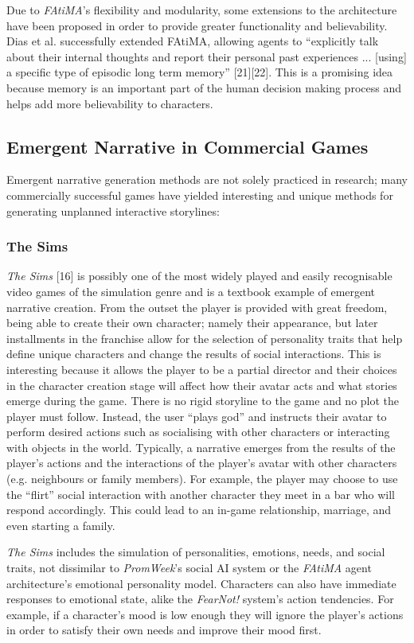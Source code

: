 \documentclass{sig-alternate-05-2015}
\begin{document}
Due to \textit{FAtiMA}'s flexibility and modularity, some extensions to the architecture have been proposed in order to provide greater functionality and believability. Dias et al. successfully extended FAtiMA, allowing agents to ``explicitly talk about their internal thoughts and report their personal past experiences ... [using] a specific type of episodic long term memory'' [21][22]. This is a promising idea because memory is an important part of the human decision making process and helps add more believability to characters.

\subsection{Emergent Narrative in Commercial Games}
Emergent narrative generation methods are not solely practiced in research; many commercially successful games have yielded interesting and unique methods for generating unplanned interactive storylines:

\subsubsection{The Sims}
\textit{The Sims} [16] is possibly one of the most widely played and easily recognisable video games of the simulation genre and is a textbook example of emergent narrative creation. 
From the outset the player is provided with great freedom, being able to create their own character; namely their appearance, but later installments in the franchise allow for the selection of personality traits that help define unique characters and change the results of social interactions. This is interesting because it allows the player to be a partial director and their choices in the character creation stage will affect how their avatar acts and what stories emerge during the game. There is no rigid storyline to the game and no plot the player must follow. Instead, the user ``plays god'' and instructs their avatar to perform desired actions such as socialising with other characters or interacting with objects in the world. Typically, a narrative emerges from the results of the player's actions and the interactions of the player's avatar with other characters (e.g. neighbours or family members). For example, the player may choose to use the ``flirt'' social interaction with another character they meet in a bar who will respond accordingly. This could lead to an in-game relationship, marriage, and even starting a family.

\textit{The Sims} includes the simulation of personalities, emotions, needs, and social traits, not dissimilar to \textit{PromWeek}'s social AI system or the \textit{FAtiMA} agent architecture's emotional personality model. Characters can also have immediate responses to emotional state, alike the \textit{FearNot!} system's action tendencies. For example, if a character's mood is low enough they will ignore the player's actions in order to satisfy their own needs and improve their mood first.
\end{document}
